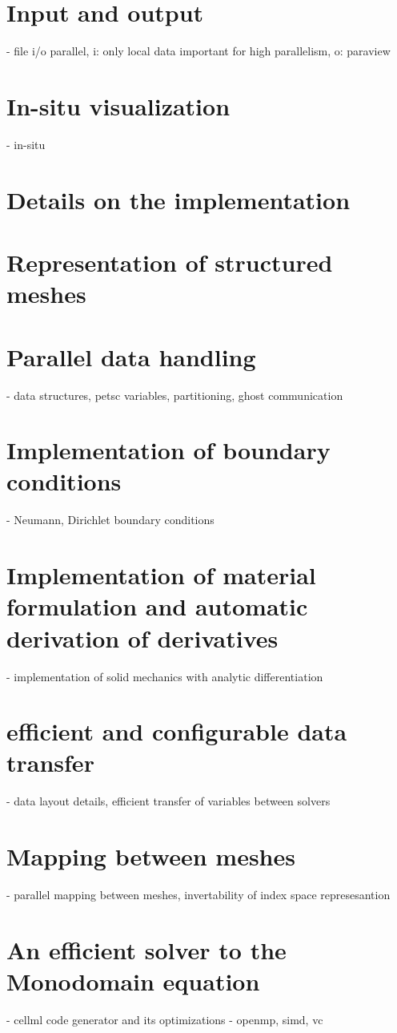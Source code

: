     \section{Input and output}
    - file i/o parallel, i: only local data important for high parallelism, o: paraview
    \section{In-situ visualization}
    - in-situ
    \section{Details on the implementation}
    \section{Representation of structured meshes}
    \section{Parallel data handling}
    - data structures, petsc variables, partitioning, ghost communication
    \section{Implementation of boundary conditions}
    - Neumann, Dirichlet boundary conditions
    \section{Implementation of material formulation and automatic derivation of derivatives}
    - implementation of solid mechanics with analytic differentiation
    
    \section{efficient and configurable data transfer}
    - data layout details, efficient transfer of variables between solvers
    \section{Mapping between meshes}
    - parallel mapping between meshes, invertability of index space represesantion
    \section{An efficient solver to the Monodomain equation}    
    - cellml code generator and its optimizations - openmp, simd, vc
